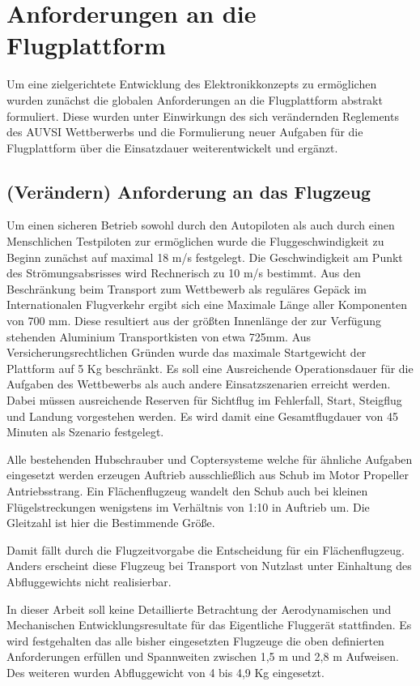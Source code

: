 \chapter{Anforderungen an die Flugplattform}\label{cha:Anforderungen an die Flugplattform}

Um eine zielgerichtete Entwicklung des Elektronikkonzepts zu ermöglichen wurden zunächst die globalen Anforderungen an die Flugplattform abstrakt formuliert. Diese wurden unter Einwirkungn des sich verändernden Reglements des AUVSI Wettberwerbs und die Formulierung neuer Aufgaben für die Flugplattform über die Einsatzdauer weiterentwickelt und ergänzt.  


\section{(Verändern) Anforderung an das Flugzeug}

Um einen sicheren Betrieb sowohl durch den Autopiloten als auch durch einen Menschlichen Testpiloten zur ermöglichen
wurde die Fluggeschwindigkeit zu Beginn zunächst auf maximal 18 m/s festgelegt. Die Geschwindigkeit am Punkt des Strömungsabsrisses wird Rechnerisch zu 10 m/s bestimmt.
Aus den Beschränkung beim Transport zum Wettbewerb als reguläres Gepäck im Internationalen Flugverkehr ergibt sich eine Maximale Länge aller Komponenten von 700 mm. Diese resultiert aus der größten Innenlänge der zur Verfügung stehenden Aluminium Transportkisten von etwa 725mm.
Aus Versicherungsrechtlichen Gründen wurde das maximale Startgewicht der Plattform auf 5 Kg beschränkt.
Es soll eine Ausreichende Operationsdauer für die Aufgaben des Wettbewerbs als auch andere Einsatzszenarien 
erreicht werden. Dabei müssen ausreichende Reserven für Sichtflug im Fehlerfall, Start, Steigflug und Landung vorgestehen werden.
Es wird damit eine Gesamtflugdauer von 45 Minuten als Szenario festgelegt.

Alle bestehenden Hubschrauber und Coptersysteme welche für ähnliche Aufgaben eingesetzt werden erzeugen Auftrieb ausschließlich aus Schub im Motor Propeller Antriebsstrang. Ein Flächenflugzeug wandelt den Schub auch bei kleinen Flügelstreckungen wenigstens im Verhältnis von 1:10 in Auftrieb um. Die Gleitzahl ist hier die Bestimmende Größe.

Damit fällt durch die Flugzeitvorgabe die Entscheidung für ein Flächenflugzeug. Anders erscheint diese Flugzeug bei Transport von Nutzlast unter Einhaltung des Abfluggewichts nicht realisierbar.

In dieser Arbeit soll keine Detaillierte Betrachtung der Aerodynamischen und Mechanischen Entwicklungsresultate für das Eigentliche Fluggerät stattfinden. Es wird festgehalten das alle bisher eingesetzten Flugzeuge die oben definierten Anforderungen erfüllen und Spannweiten zwischen 1,5 m und 2,8 m Aufweisen. Des weiteren wurden Abfluggewicht von 4 bis 4,9 Kg eingesetzt.


